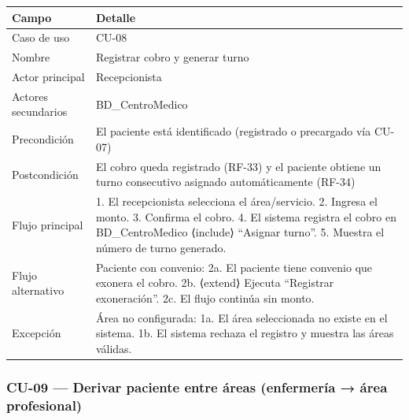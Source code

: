 \documentclass[11pt,a4paper]{article}
\begin{document}
	\begin{longtable}{p{} p{} }
		
		
		\toprule
		\textbf{Campo} &
		\textbf{Detalle}  \\
		\midrule
		\endhead
		
		Caso de uso & CU-08 \\
		Nombre & Registrar cobro y generar turno \\
		Actor principal & Recepcionista \\
		Actores secundarios & BD\_CentroMedico \\
		Precondición & El paciente está identificado (registrado o precargado vía CU-07) \\
		Postcondición & El cobro queda registrado (RF-33) y el paciente obtiene un turno consecutivo asignado automáticamente (RF-34) \\
		Flujo principal & 1. El recepcionista selecciona el área/servicio. 2. Ingresa el monto. 3. Confirma el cobro. 4. El sistema registra el cobro en BD\_CentroMedico ⟨include⟩ ``Asignar turno''. 5. Muestra el número de turno generado. \\
		Flujo alternativo & Paciente con convenio: 2a. El paciente tiene convenio que exonera el cobro. 2b. ⟨extend⟩ Ejecuta ``Registrar exoneración''. 2c. El flujo continúa sin monto. \\
		Excepción & Área no configurada: 1a. El área seleccionada no existe en el sistema. 1b. El sistema rechaza el registro y muestra las áreas válidas. \\
		\bottomrule
	\end{longtable}
	
	\subsubsection{CU-09 --- Derivar paciente entre áreas (enfermería → área profesional)}
	
\end{document}
